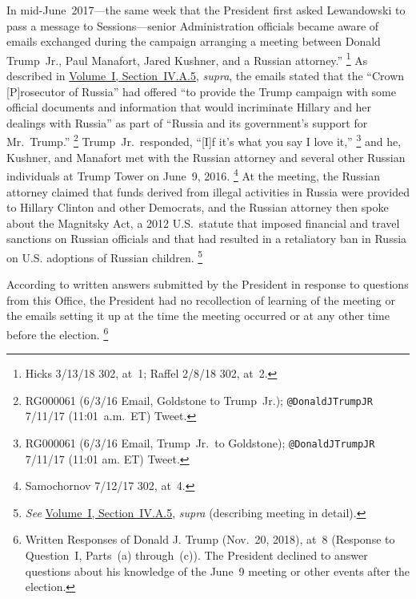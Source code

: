 In mid-June~2017---the same week that the President first asked Lewandowski to pass a message to Sessions---senior Administration officials became aware of emails exchanged during the campaign arranging a meeting between Donald Trump~Jr., Paul Manafort, Jared Kushner, and a Russian attorney.''%
\footnote{Hicks 3/13/18 302, at~1;
Raffel 2/8/18 302, at~2.}
As described in \hyperlink{subsubsection.1.4.1.5}{Volume~I, Section~IV.A.5}, \textit{supra}, the emails stated that the ``Crown [P]rosecutor of Russia'' had offered ``to provide the Trump campaign with some official documents and information that would incriminate Hillary and her dealings with Russia'' as part of ``Russia and its government's support for Mr.~Trump.''%
\footnote{RG000061 (6/3/16 Email, Goldstone to Trump~Jr.);
\verb+@DonaldJTrumpJR+ 7/11/17 (11:01~a.m.~ET) Tweet.}
Trump~Jr.\ responded, ``[I]f it's what you say I love it,''%
\footnote{RG000061 (6/3/16 Email, Trump~Jr.\ to Goldstone);
\verb+@DonaldJTrumpJR+ 7/11/17 (11:01 am. ET) Tweet.}
and he, Kushner, and Manafort met with the Russian attorney and several other Russian individuals at Trump Tower on June~9, 2016.%
\footnote{Samochornov 7/12/17 302, at~4.}
At the meeting, the Russian attorney claimed that funds derived from illegal activities in Russia were provided to Hillary Clinton and other Democrats, and the Russian attorney then spoke about the Magnitsky Act, a 2012 U.S.~statute that imposed financial and travel sanctions on Russian officials and that had resulted in a retaliatory ban in Russia on U.S. adoptions of Russian children.%
\footnote{\textit{See} \hyperlink{subsubsection.1.4.1.5}{Volume~I, Section~IV.A.5}, \textit{supra} (describing meeting in detail).}

According to written answers submitted by the President in response to questions from this Office, the President had no recollection of learning of the meeting or the emails setting it up at the time the meeting occurred or at any other time before the election.%
\footnote{Written Responses of Donald J. Trump (Nov.~20, 2018), at~8 (Response to Question~I, Parts~(a) through~(c)).
The President declined to answer questions about his knowledge of the June~9 meeting or other events after the election.}


